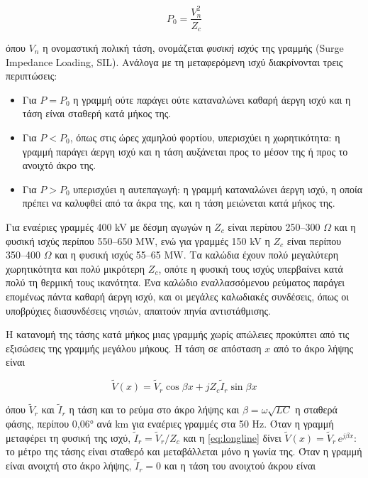 \begin{equation}
P_0 = \frac{V_n^2}{Z_c}
\label{eq:sil}
\end{equation}

όπου $V_n$ η ονομαστική πολική τάση, ονομάζεται \emph{φυσική ισχύς} της γραμμής (Surge
Impedance Loading, SIL). Ανάλογα με τη μεταφερόμενη ισχύ διακρίνονται τρεις περιπτώσεις:

\begin{itemize}
\item Για $P = P_0$ η γραμμή ούτε παράγει ούτε καταναλώνει καθαρή άεργη ισχύ και η τάση είναι
      σταθερή κατά μήκος της.
\item Για $P < P_0$, όπως στις ώρες χαμηλού φορτίου, υπερισχύει η χωρητικότητα: η γραμμή
      παράγει άεργη ισχύ και η τάση αυξάνεται προς το μέσον της ή προς το ανοιχτό άκρο της.
\item Για $P > P_0$ υπερισχύει η αυτεπαγωγή: η γραμμή καταναλώνει άεργη ισχύ, η οποία πρέπει
      να καλυφθεί από τα άκρα της, και η τάση μειώνεται κατά μήκος της.
\end{itemize}

Για εναέριες γραμμές 400 kV με δέσμη αγωγών η $Z_c$ είναι περίπου 250--300 $\Omega$ και η
φυσική ισχύς περίπου 550--650 MW, ενώ για γραμμές 150 kV η $Z_c$ είναι περίπου 350--400
$\Omega$ και η φυσική ισχύς 55--65 MW. Τα καλώδια έχουν πολύ μεγαλύτερη χωρητικότητα και πολύ
μικρότερη $Z_c$, οπότε η φυσική τους ισχύς υπερβαίνει κατά πολύ τη θερμική τους ικανότητα.
Ένα καλώδιο εναλλασσόμενου ρεύματος παράγει επομένως πάντα καθαρή άεργη ισχύ, και οι μεγάλες
καλωδιακές συνδέσεις, όπως οι υποβρύχιες διασυνδέσεις νησιών, απαιτούν πηνία αντιστάθμισης.

Η κατανομή της τάσης κατά μήκος μιας γραμμής χωρίς απώλειες προκύπτει από τις εξισώσεις της
γραμμής μεγάλου μήκους. Η τάση σε απόσταση $x$ από το άκρο λήψης είναι

\begin{equation}
\tilde{V}(x) = \tilde{V}_r \cos\beta x + j Z_c \tilde{I}_r \sin\beta x
\label{eq:longline}
\end{equation}

όπου $\tilde{V}_r$ και $\tilde{I}_r$ η τάση και το ρεύμα στο άκρο λήψης και
$\beta = \omega\sqrt{LC}$ η σταθερά φάσης, περίπου 0,06° ανά km για εναέριες γραμμές στα
50 Hz. Όταν η γραμμή μεταφέρει τη φυσική της ισχύ, $\tilde{I}_r = \tilde{V}_r / Z_c$ και η
\eqref{eq:longline} δίνει $\tilde{V}(x) = \tilde{V}_r\, e^{j\beta x}$: το μέτρο της τάσης
είναι σταθερό και μεταβάλλεται μόνο η γωνία της. Όταν η γραμμή είναι ανοιχτή στο άκρο λήψης,
$\tilde{I}_r = 0$ και η τάση του ανοιχτού άκρου είναι

